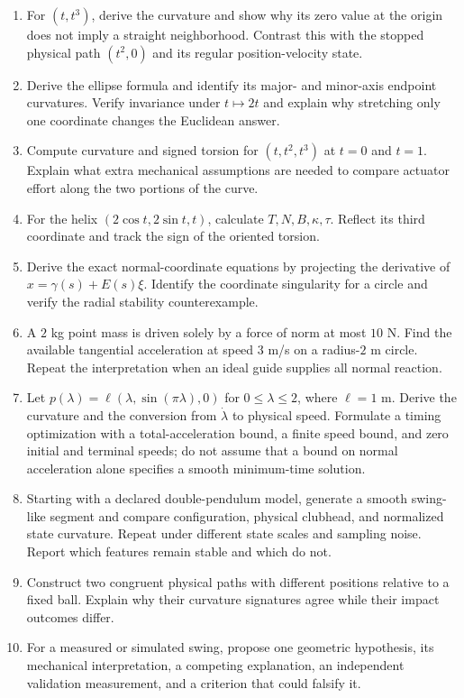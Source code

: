 \begin{enumerate}[itemsep=2pt,parsep=0pt]
\item For $(t,t^3)$, derive the curvature and show why its zero value at the
   origin does not imply a straight neighborhood. Contrast this with the
   stopped physical path $(t^2,0)$ and its regular position-velocity state.
\item Derive the ellipse formula and identify its major- and minor-axis
   endpoint curvatures. Verify invariance under $t\mapsto 2t$ and explain
   why stretching only one coordinate changes the Euclidean answer.
\item Compute curvature and signed torsion for $(t,t^2,t^3)$ at $t=0$ and
   $t=1$. Explain what extra mechanical assumptions are needed to compare
   actuator effort along the two portions of the curve.
\item For the helix $(2\cos t,2\sin t,t)$, calculate $T,N,B,\kappa,\tau$.
   Reflect its third coordinate and track the sign of the oriented torsion.
\item Derive the exact normal-coordinate equations by projecting the
   derivative of $x=\gamma(s)+E(s)\xi$. Identify the coordinate singularity
   for a circle and verify the radial stability counterexample.
\item A $2$ kg point mass is driven solely by a force of norm at most
   $10$ N. Find the available tangential acceleration at speed $3$ m/s on a
   radius-$2$ m circle. Repeat the interpretation when an ideal guide
   supplies all normal reaction.
\item Let $p(\lambda)=\ell(\lambda,\sin(\pi\lambda),0)$ for
   $0\le\lambda\le2$, where $\ell=1$ m. Derive the curvature and the
   conversion from $\dot\lambda$ to physical speed. Formulate a timing
   optimization with a total-acceleration bound, a finite speed bound, and
   zero initial and terminal speeds; do not assume that a bound on normal
   acceleration alone specifies a smooth minimum-time solution.
\item Starting with a declared double-pendulum model, generate a smooth
   swing-like segment and compare configuration, physical clubhead, and
   normalized state curvature. Repeat under different state scales and
   sampling noise. Report which features remain stable and which do not.
\item Construct two congruent physical paths with different positions
   relative to a fixed ball. Explain why their curvature signatures agree
   while their impact outcomes differ.
\item For a measured or simulated swing, propose one geometric hypothesis,
   its mechanical interpretation, a competing explanation, an independent
   validation measurement, and a criterion that could falsify it.
\end{enumerate}
